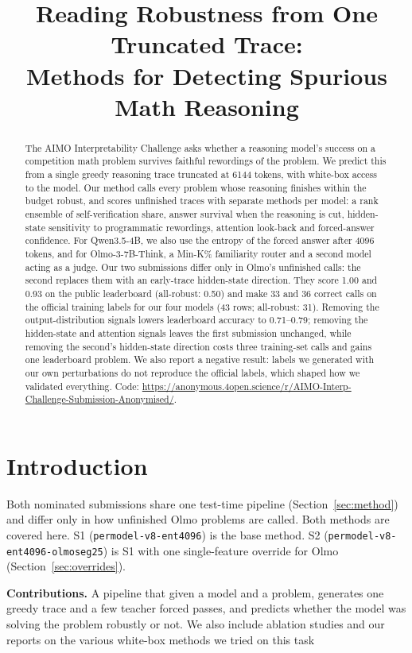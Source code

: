 \documentclass{article}
\title{Reading Robustness from One Truncated Trace:\\Methods for Detecting Spurious Math Reasoning}
\author{\reportauthors}
\providecommand{\codeurl}{\url{https://anonymous.4open.science/r/AIMO-Interp-Challenge-Submission-Anonymised/}}
\newcommand{\sone}{\textsc{S1}}
\newcommand{\stwo}{\textsc{S2}}
\begin{document}
\maketitle

\begin{abstract}
The AIMO Interpretability Challenge asks whether a reasoning model's success on a competition math problem survives faithful rewordings of the problem.
We predict this from a single greedy reasoning trace truncated at 6144 tokens, with white-box access to the model.
Our method calls every problem whose reasoning finishes within the budget robust, and scores unfinished traces with separate methods per model: a rank ensemble of self-verification share, answer survival when the reasoning is cut, hidden-state sensitivity to programmatic rewordings, attention look-back and forced-answer confidence. For Qwen3.5-4B, we also use the entropy of the forced answer after 4096 tokens, and for Olmo-3-7B-Think, a Min-K\% familiarity router and a second model acting as a judge.
Our two submissions differ only in Olmo's unfinished calls: the second replaces them with an early-trace hidden-state direction.
They score 1.00 and 0.93 on the public leaderboard (all-robust: 0.50) and make 33 and 36 correct calls on the official training labels for our four models (43 rows; all-robust: 31). Removing the output-distribution signals lowers leaderboard accuracy to 0.71--0.79; removing the hidden-state and attention signals leaves the first submission unchanged, while removing the second's hidden-state direction costs three training-set calls and gains one leaderboard problem.
We also report a negative result: labels we generated with our own perturbations do not reproduce the official labels, which shaped how we validated everything.
Code: \codeurl.
\end{abstract}

\section{Introduction}
\label{sec:intro}
Both nominated submissions share one test-time pipeline (Section~\ref{sec:method}) and differ only in how unfinished Olmo problems are called. Both methods are covered here.
\sone{} (\texttt{permodel-v8-ent4096}) is the base method. \stwo{} (\texttt{permodel-v8-ent4096-olmoseg25}) is \sone{} with one single-feature override for Olmo (Section~\ref{sec:overrides}).

\textbf{Contributions.} A pipeline that given a model and a problem, generates one greedy trace and a few teacher forced passes, and predicts whether the model was solving the problem robustly or not. We also include ablation studies and our reports on the various white-box methods we tried on this task
\end{document}

